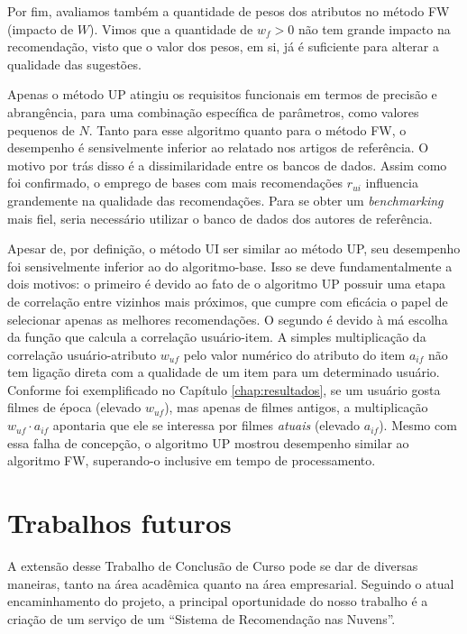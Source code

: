 Por fim, avaliamos também a quantidade de pesos dos atributos no método FW (impacto de $W$). Vimos que a quantidade de $w_f>0$ não tem grande impacto na recomendação, visto que o valor dos pesos, em si, já é suficiente para alterar a qualidade das sugestões.

Apenas o método UP atingiu os requisitos funcionais em termos de precisão e abrangência, para uma combinação específica de parâmetros, como valores pequenos de $N$. Tanto para esse algoritmo quanto para o método FW, o desempenho é sensivelmente inferior ao relatado nos artigos de referência. O motivo por trás disso é a dissimilaridade entre os bancos de dados. Assim como foi confirmado, o emprego de bases com mais recomendações $r_{ui}$ influencia grandemente na qualidade das recomendações. Para se obter um \textit{benchmarking} mais fiel, seria necessário utilizar o banco de dados dos autores de referência. 

Apesar de, por definição, o método UI ser similar ao método UP, seu desempenho foi sensivelmente inferior ao do algoritmo-base. Isso se deve fundamentalmente a dois motivos: o primeiro é devido ao fato de o algoritmo UP possuir uma etapa de correlação entre vizinhos mais próximos, que cumpre com eficácia o papel de selecionar apenas as melhores recomendações. O segundo é devido à má escolha da função que calcula a correlação usuário-item. A simples multiplicação da correlação usuário-atributo $w_{uf}$ pelo valor numérico do atributo do item $a_{if}$ não tem ligação direta com a qualidade de um item para um determinado usuário. Conforme foi exemplificado no Capítulo \ref{chap:resultados}, se um usuário gosta filmes de época (elevado $w_{uf}$), mas apenas de filmes antigos, a multiplicação $w_{uf} \cdot a_{if} $ apontaria que ele se interessa por filmes \textit{atuais} (elevado $a_{if}$). Mesmo com essa falha de concepção, o algoritmo UP mostrou desempenho similar ao algoritmo FW, superando-o inclusive em tempo de processamento.

\section{Trabalhos futuros} %
\label{sec:trabalhos_futuros}

A extensão desse Trabalho de Conclusão de Curso pode se dar de diversas maneiras, tanto na área acadêmica quanto na área empresarial. Seguindo o atual encaminhamento do projeto, a principal oportunidade do nosso trabalho é a criação de um serviço de um ``Sistema de Recomendação nas Nuvens''. 

